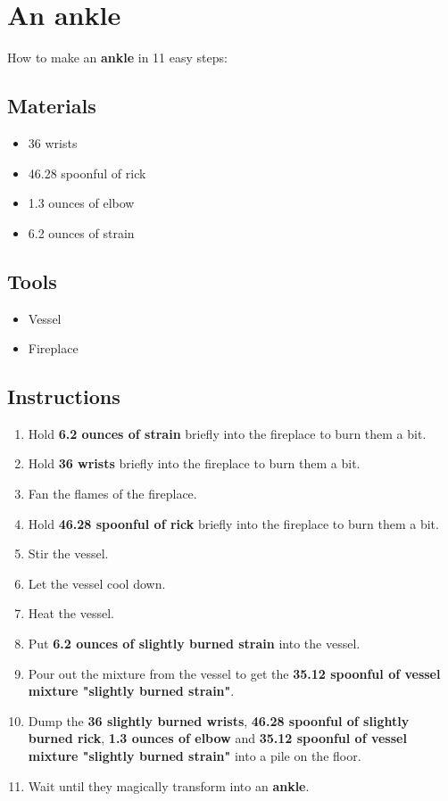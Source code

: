 \documentclass{article}
\begin{document}
\section{An ankle}How to make an \textbf{ankle} in 11 easy steps:

\subsection{Materials}\begin{itemize}
\item 
36 wrists
\item 
46.28 spoonful of rick
\item 
1.3 ounces of elbow
\item 
6.2 ounces of strain
\end{itemize}
\subsection{Tools}\begin{itemize}
\item 
Vessel
\item 
Fireplace
\end{itemize}
\subsection{Instructions}\begin{enumerate}
\item 
Hold \textbf{6.2 ounces of strain} briefly into the fireplace to burn them a bit.
\item 
Hold \textbf{36 wrists} briefly into the fireplace to burn them a bit.
\item 
Fan the flames of the fireplace.
\item 
Hold \textbf{46.28 spoonful of rick} briefly into the fireplace to burn them a bit.
\item 
Stir the vessel.
\item 
Let the vessel cool down.
\item 
Heat the vessel.
\item 
Put \textbf{6.2 ounces of slightly burned strain} into the vessel.
\item 
Pour out the mixture from the vessel to get the \textbf{35.12 spoonful of vessel mixture "slightly burned strain"}.
\item 
Dump the \textbf{36 slightly burned wrists}, \textbf{46.28 spoonful of slightly burned rick}, \textbf{1.3 ounces of elbow} and \textbf{35.12 spoonful of vessel mixture "slightly burned strain"} into a pile on the floor.
\item 
Wait until they magically transform into an \textbf{ankle}.
\end{enumerate}
\newpage
\end{document}
